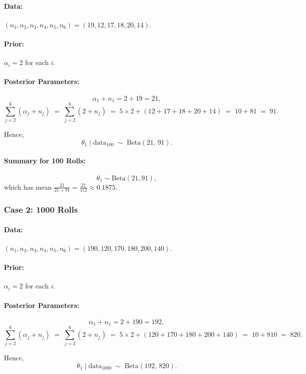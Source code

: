 \documentclass[final,11pt]{article}
\begin{document}
\begin{spacing}{1.25}
\paragraph{Data:} \((n_1,n_2,n_3,n_4,n_5,n_6) = (19,12,17,18,20,14)\).

\paragraph{Prior:} \(\alpha_i = 2\) for each \(i\).

\paragraph{Posterior Parameters:}
\[
\alpha_1 + n_1 = 2 + 19 = 21,
\]
\[
\sum_{j=2}^6 (\alpha_j + n_j) \;=\; \sum_{j=2}^6 (2 + n_j)
\;=\; 5 \times 2 + (12 + 17 + 18 + 20 + 14)
\;=\; 10 + 81
\;=\; 91.
\]

Hence,
\[
\theta_1 \mid \text{data}_{100} 
\;\sim\; \text{Beta}(21,\,91).
\]

\paragraph{Summary for 100 Rolls:}
\[
\theta_1 \sim \text{Beta}(21,91), 
\]
which has mean 
\(\displaystyle \frac{21}{21 + 91} = \frac{21}{112} \approx 0.1875.\)

\subsubsection*{Case 2: 1000 Rolls}

\paragraph{Data:} \((n_1,n_2,n_3,n_4,n_5,n_6) = (190,120,170,180,200,140)\).

\paragraph{Prior:} \(\alpha_i = 2\) for each \(i\).

\paragraph{Posterior Parameters:}
\[
\alpha_1 + n_1 = 2 + 190 = 192,
\]
\[
\sum_{j=2}^6 (\alpha_j + n_j) \;=\; \sum_{j=2}^6 (2 + n_j)
\;=\; 5 \times 2 + (120 + 170 + 180 + 200 + 140)
\;=\; 10 + 810
\;=\; 820.
\]

Hence,
\[
\theta_1 \mid \text{data}_{1000} 
\;\sim\; \text{Beta}(192,\,820).
\]


\end{spacing}
\end{document}
